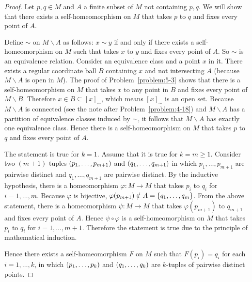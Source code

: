 \begin{proof}
	Let \( p, q\in M \) and \( A \) a finite subset of \( M \) not containing \( p, q \). We will show that there exists a self-homeomorphism on \( M \) that takes \( p \) to \( q \) and fixes every point of \( A \).

	Define \( \sim \) on \( M\smallsetminus A \) as follows: \( x \sim y \) if and only if there exists a self-homeomorphism on \( M \) such that takes \( x \) to \( y \) and fixes every point of \( A \). So \( \sim \) is an equivalence relation. Consider an equivalence class and a point \( x \) in it. There exists a regular coordinate ball \( B \) containing \( x \) and not intersecting \( A \) (because \( M\smallsetminus A \) is open in \( M \)). The proof of Problem~\ref{problem:5-3} shows that there is a self-homeomorphism on \( M \) that takes \( x \) to any point in \( B \) and fixes every point of \( M\smallsetminus B \). Therefore \( x \in B \subseteq {[x]}_{\sim} \), which means \( {[x]}_{\sim} \) is an open set. Because \( M\smallsetminus A \) is connected (see the note after Problem~\ref{problem:4-18}) and \( M\smallsetminus A \) has a partition of equivalence classes induced by \( \sim \), it follows that \( M\smallsetminus A \) has exactly one equivalence class. Hence there is a self-homeomorphism on \( M \) that takes \( p \) to \( q \) and fixes every point of \( A \).

	The statement is true for \( k = 1 \). Assume that it is true for \( k = m \geq 1 \). Consider two \( (m+1) \)-tuples \( \left({p_{1}, \ldots, p_{m+1}}\right) \) and \( \left({q_{1}, \ldots, q_{m+1}}\right) \) in which \( p_{1}, \ldots, p_{m+1} \) are pairwise distinct and \( q_{1}, \ldots, q_{m+1} \) are pairwise distinct. By the inductive hypothesis, there is a homeomorphism \( \varphi: M\to M \) that takes \( p_{i} \) to \( q_{i} \) for \( i = 1, \ldots, m \). Because \( \varphi \) is bijective, \( \varphi(p_{m+1}) \notin A = \left\{{ q_{1}, \ldots, q_{m} }\right\} \). From the above statement, there is a homeomorphism \( \psi: M\to M \) that takes \( \varphi(p_{m+1}) \) to \( q_{m+1} \) and fixes every point of \( A \). Hence \( \psi\circ\varphi \) is a self-homeomorphism on \( M \) that takes \( p_{i} \) to \( q_{i} \) for \( i = 1, \ldots, m+1 \). Therefore the statement is true due to the principle of mathematical induction.

	Hence there exists a self-homeomorphism \( F \) on \( M \) such that \( F(p_{i}) = q_{i} \) for each \( i = 1, \ldots, k \), in which \( \left({p_{1}, \ldots, p_{k}}\right) \) and \( \left({q_{1}, \ldots, q_{k}}\right) \) are \( k \)-tuples of pairwise distinct points.
\end{proof}

